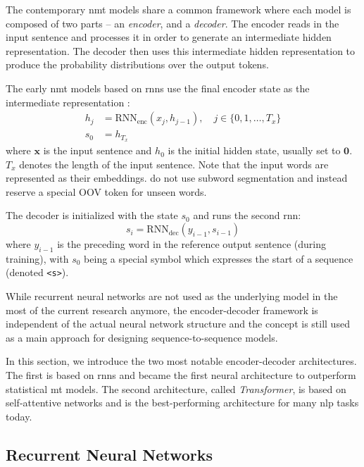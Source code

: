 The contemporary \ac{nmt} models share a common framework where each model is
composed of two parts -- an \emph{encoder}, and a \emph{decoder}. The encoder
reads in the input sentence and processes it in order to generate an
intermediate hidden representation.  The decoder then uses this intermediate
hidden representation to produce the probability distributions over the output
tokens.

The early \ac{nmt} models based on \acp{rnn} use the final encoder state as the
intermediate representation \citep{sutskever2014sequence}:
%
\begin{align}
  h_j &= \mathrm{RNN}_{\text{enc}}(x_j, h_{j-1}), \quad j \in
          \{0, 1, \ldots, T_x \} \\
  s_0 &= h_{T_x}
\end{align}
%
where $\mathbf{x}$ is the input sentence and $h_0$ is the initial hidden state,
usually set to $\mathbf{0}$. $T_x$ denotes the length of the input sentence.
Note that the input words are represented as their embeddings.
\citet{sutskever2014sequence} do not use subword segmentation and instead
reserve a special OOV token for unseen words.

The decoder is initialized with the state $s_0$ and runs the second \ac{rnn}:
\begin{equation} s_i = \mathrm{RNN}_{\text{dec}}(y_{i-1}, s_{i-1})
\end{equation}
%
where $y_{i-1}$ is the preceding word in the reference output sentence (during
training), with $s_0$ being a special symbol which expresses the start of a
sequence (denoted \texttt{<s>}).

While recurrent neural networks are not used as the underlying model in the most
of the current research anymore, the encoder-decoder framework is independent of
the actual neural network structure and the concept is still used as a main
approach for designing sequence-to-sequence models.

In this section, we introduce the two most notable encoder-decoder
architectures. The first is based on \acp{rnn} and became the first neural
architecture to outperform statistical \ac{mt} models. The second architecture,
called \emph{Transformer}, is based on self-attentive networks and is the
best-performing architecture for many \ac{nlp} tasks today.


\subsection{Recurrent Neural Networks}
\label{sec:encdec:rnn}

